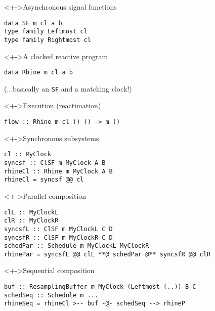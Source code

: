 \documentclass{enigtex-beamer-base}
\begin{document}
\begin{frame}[fragile]
\begin{block}<+->{Asynchronous signal functions}
\begin{verbatim}
data SF m cl a b
type family Leftmost cl
type family Rightmost cl
\end{verbatim}
\end{block}
\begin{block}<+->{A clocked reactive program}
\begin{verbatim}
data Rhine m cl a b
\end{verbatim}
(...basically an \texttt{SF} and a matching clock!)
\end{block}
\begin{block}<+->{Execution (reactimation)}
\begin{verbatim}
flow :: Rhine m cl () () -> m ()
\end{verbatim}
\end{block}
\end{frame}

\begin{frame}[fragile]
\begin{block}<+->{Synchronous subsystems}
\begin{verbatim}
cl :: MyClock
syncsf :: ClSF m MyClock A B
rhineCl :: Rhine m MyClock A B
rhineCl = syncsf @@ cl
\end{verbatim}
\end{block}
\end{frame}

\begin{frame}[fragile]
\begin{block}<+->{Parallel composition}
\begin{verbatim}
clL :: MyClockL
clR :: MyClockR
syncsfL :: ClSF m MyClockL C D
syncsfR :: ClSF m MyClockR C D
schedPar :: Schedule m MyClockL MyClockR
rhinePar = syncsfL @@ clL **@ schedPar @** syncsfR @@ clR
\end{verbatim}
\end{block}
\begin{block}<+->{Sequential composition}
\begin{verbatim}
buf :: ResamplingBuffer m MyClock (Leftmost (..)) B C
schedSeq :: Schedule m ...
rhineSeq = rhineCl >-- buf -@- schedSeq --> rhineP
\end{verbatim}
\end{block}
\end{frame}

\begin{comment}
	Introduction what Rhine can do
	Basic vocab
		Arrowized FRP
		Synchronous subsystems
		Clocks
		Schedules
		Resampling buffers
		Events and behaviours
	Comparison (differences, +, -) to
		Yampa
		dunai, auto, varying
		classical FRP
		Pipes, conduit
	Further plan
		Mission statement what we want to implement
			Ideas
				FRP zoo
					Extra features?
				Tea time
					First without, then with GUI
		Given enough time, implement audience suggestions
\end{comment}
\end{document}
